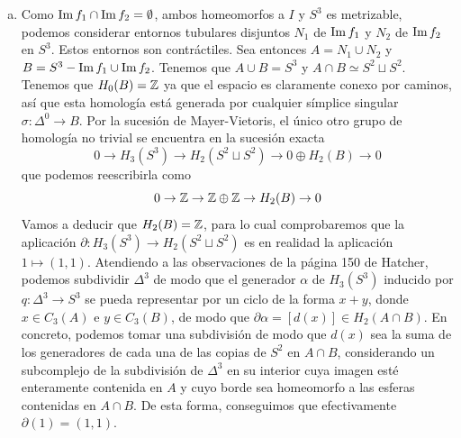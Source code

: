 \documentclass[twoside]{article}
\begin{document}
\begin{solucion}
\begin{enumerate}[(a)]
\item Como $\operatorname{Im} f_1\cap\operatorname{Im} f_2=\emptyset$, ambos homeomorfos a $I$ y $S^3$ es metrizable, podemos considerar entornos tubulares disjuntos $N_1$ de $\operatorname{Im} f_1$ y $N_2$ de $\operatorname{Im} f_2$ en $S^3$. Estos entornos son contráctiles. Sea entonces $A=N_1\cup N_2$ y $B=S^3-\operatorname{Im} f_1\cup \operatorname{Im} f_2$. Tenemos que $A\cup B=S^3$ y $A\cap B\simeq S^2\sqcup S^2$. Tenemos que $H_0(B)=\mathbb{Z}$ ya que el espacio es claramente conexo por caminos, así que esta homología está generada por cualquier símplice singular $\sigma:\Delta^0\to B$. Por la sucesión de Mayer-Vietoris, el único otro grupo de homología no trivial se encuentra en la sucesión exacta
\[
0\to H_3(S^3)\to H_2(S^2\sqcup S^2)\to 0\oplus H_2(B)\to 0
\]
que podemos reescribirla como
\[
0\to\mathbb{Z}\to \mathbb{Z}\oplus\mathbb{Z}\to H_2(B)\to 0
\]
Vamos a deducir que $H_2(B)=\mathbb{Z}$, para lo cual comprobaremos que la aplicación $\partial: H_3(S^3)\to H_2(S^2\sqcup S^2)$ es en realidad la aplicación $1\mapsto (1,1)$. Atendiendo a las observaciones de la página 150 de Hatcher, podemos subdividir $\Delta^3$ de modo que el generador $\alpha$ de $H_3(S^3)$ inducido por $q:\Delta^3\to S^3$ se pueda representar por un ciclo de la forma $x+y$, donde $x\in C_3(A)$ e $y\in C_3(B)$, de modo que $\partial\alpha =[d(x)]\in H_2(A\cap B)$. En concreto, podemos tomar una subdivisión de modo que $d(x)$ sea la suma de los generadores de cada una de las copias de $S^2$ en $A\cap B$, considerando un subcomplejo de la subdivisión de $\Delta^3$ en su interior cuya imagen esté enteramente contenida en $A$ y cuyo borde sea homeomorfo a las esferas contenidas en $A\cap B$. De esta forma, conseguimos que efectivamente $\partial(1)=(1,1)$. 


\end{enumerate}
\end{solucion}
\end{document}
